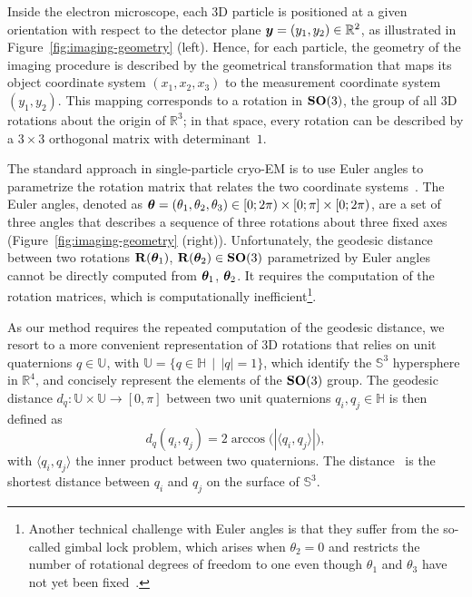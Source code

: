 Inside the electron microscope, each 3D particle is positioned at a given orientation with respect to the detector plane ${\boldsymbol{y}}=(y_1,y_2)\in \mathbb{R}^2$, as illustrated in Figure~\ref{fig:imaging-geometry} (left). Hence, for each particle, the geometry of the imaging procedure is described by the geometrical transformation that maps its object coordinate system $(x_1,x_2,x_3)$ to the measurement coordinate system $(y_1,y_2)$. This mapping corresponds to a rotation in $\mathrm{\mathbf{SO}}(3)$, the group of all 3D rotations about the origin of $\mathbb{R}^3$; in that space, every rotation can be described by a $3\times3$ orthogonal matrix with determinant~$1$.

The standard approach in single-particle cryo-EM is to use Euler angles to parametrize the rotation matrix that relates the two coordinate systems~\cite{sorzano2014interchanging}. The Euler angles, denoted as ${\boldsymbol{\theta}}=(\theta_1,\theta_2,\theta_3)\in [0;2\pi)\times [0;\pi] \times [0;2\pi)$, are a set of three angles that describes a sequence of three rotations about three fixed axes (Figure~\ref{fig:imaging-geometry} (right)).
Unfortunately, the geodesic distance between two rotations $\mathbf{R}({\boldsymbol{\theta}}_1)$, $\mathbf{R}({\boldsymbol{\theta}}_2)\in \mathrm{\mathbf{SO}}(3)$ parametrized by Euler angles cannot be directly computed from ${\boldsymbol{\theta}}_1$, ${\boldsymbol{\theta}}_2$.
It requires the computation of the rotation matrices, which is computationally inefficient\footnote{Another technical challenge with Euler angles is that they suffer from the so-called gimbal lock problem, which arises when $\theta_2=0$ and restricts the number of rotational degrees of freedom to one even though $\theta_1$ and $\theta_3$ have not yet been fixed~\cite{koks2006explorations}.}.

As our method requires the repeated computation of the geodesic distance, we resort to a more convenient representation of 3D rotations that relies on unit quaternions $q\in\mathbb{U}$, with  $\mathbb{U}=\big\{q\in\mathbb{H} \; \, | \; \,\lvert q \rvert =1\big\}$, which identify the $\mathbb{S}^3$ hypersphere in  $\mathbb{R}^4$, and concisely represent the elements of the $\mathrm{\mathbf{SO}}(3)$ group. The geodesic distance $d_q:\mathbb{U}\times\mathbb{U}\rightarrow [0,\pi]$ between two unit quaternions $q_i, q_j\in\mathbb{H}$ is then defined as
\begin{equation}
    d_q(q_i, q_j) = 2 \arccos \big(| \langle q_i, q_j \rangle| \big),
    \label{eqn:distance:orientations}
\end{equation}
with $\langle q_i, q_j \rangle$ the inner product between two quaternions.
The distance~ is the shortest distance between $q_i$ and $q_j$ on the surface of $\mathbb{S}^3$.

